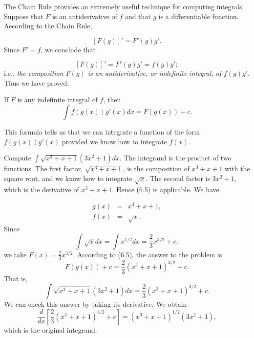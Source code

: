 
The Chain Rule provides an extremely useful technique for computing integrals. Suppose that $F$ is an antiderivative of $f$ and that $g$ is a differentiable function. Aecording to the Chain Rule,

$$
[F(g)]' = F'(g)g'.
$$
\noindent Since $F' = f$, we conclude that

$$
[F(g)]' = F'(g)g' = f(g)g';
$$
\noindent i.e., \textit{the composition $F(g)$ is an antiderivative, or indefinite integral, of $f(g)g'$}. 
Thus we have proved:

\begin{theorem} %
If $F$ is any indefinite integral of $f$, then
$$
\int f(g(x))g'(x) dx = F(g(x)) + c.
$$
\end{theorem}

This formula tells us that we can integrate a function of the form $f(g(x))g'(x)$ provided we know how to integrate $f(x)$.
\medskip

\begin{example}
Compute  $\int \sqrt {x^3 + x + 1} (3x^2 + 1)dx$. The integrand is the product of two functions. The first factor, $\sqrt{x^3 + x + 1}$, is the composition of $x^3 + x + 1$ with the square root, and we know how to integrate $\sqrt{x}$. The second factor is $3x^2 + 1$, which is the derivative of $x^3 + x + 1$.  Hence (6.5) is applicable. We have

\begin{eqnarray*}
g(x) &=& x^3+x+ 1,\\
 f(x) &=& \sqrt{x}.
\end{eqnarray*}
\noindent Since 
$$
\int \sqrt{x} dx = \int x^{1/2} dx = \frac{2}{3} x^{3/2} + c,
$$
\noindent we take $F(x) = \frac{2}{3}x^{3/2}$. According to (6.5), the answer to the problem is
$$
F(g(x)) + c = \frac{2}{3}(x^3 + x + 1)^{3/2} + c. 
$$
\noindent That is,
$$
\int \sqrt{x^3 + x + 1} (3x^2 + 1) dx = \frac{2}{3}(x^3 + x + 1)^{3/2} + c.
$$
\noindent We can check this answer by taking its derivative. We obtain
$$
\frac{d}{dx} [\frac{2}{3} (x^3 + x + 1)^{3/2} + c] = (x^3 + x + 1)^{1/2} (3x^2 + 1),
$$
\noindent which is the original integrand.
\end{example}

